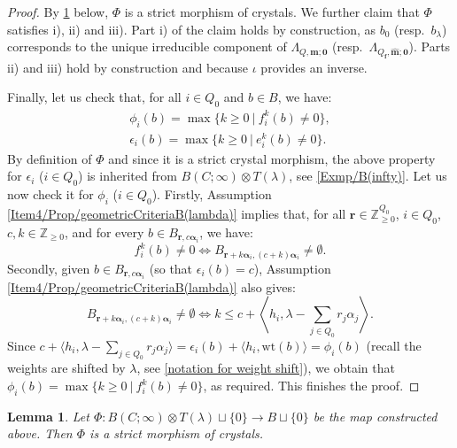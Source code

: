 \documentclass[a4paper,12pt]{article}
\theoremstyle{definition}
\theoremstyle{plain}
\newtheorem{lemma}[definition]{Lemma}
\theoremstyle{remark}
\newcommand\bbZ{\mathbb{Z}}
\newcommand\bfalpha{\bm{\alpha}}
\newcommand\bff{\mathbf{f}}
\newcommand\bfm{\mathbf{m}}
\newcommand\bfr{\mathbf{r}}
\begin{document}
\begin{proof}
By \cref{Lem/forgetfulCrystalMap} below, $\Phi$ is a strict morphism of crystals. We further claim that $\Phi$ satisfies i), ii) and iii). Part i) of the claim holds by construction, as $b_0$ (resp.\ $b_\lambda$) corresponds to the unique irreducible component of $\Lambda_{Q,\bfm;\mathbf{0}}$ (resp.\ $\Lambda_{Q_\bff,\widehat{\bfm};\mathbf{0}}$). Parts ii) and iii) hold by construction and because $\iota$ provides an inverse.

Finally, let us check that, for all $i\in Q_0$ and $b\in B$, we have:
\begin{align*}
\phi_i(b)=\max\{ k\geq0\ \vert\ f_i^k(b)\ne0\} , \\
\epsilon_i(b)=\max\{ k\geq0\ \vert\ e_i^k(b)\ne0\} .
\end{align*}
By definition of $\Phi$ and since it is a strict crystal morphism, the above property for $\epsilon_i$ ($i\in Q_0$) is inherited from $B(C;\infty)\otimes T(\lambda)$, see \cref{Exmp/B(infty)}. Let us now check it for $\phi_i$ ($i\in Q_0$). Firstly, Assumption  \ref{Item4/Prop/geometricCriteriaB(lambda)}  implies that, for all $\bfr\in\bbZ_{\geq0}^{Q_0}$, $i\in Q_0$, $c,k\in\bbZ_{\geq0}$, and for every $b\in B_{\bfr,c\bfalpha_i}$, we have:
\[
f_i^k(b)\ne0
\Leftrightarrow
B_{\bfr+k\bfalpha_i,(c+k)\bfalpha_i}\ne\emptyset
.
\]
Secondly, given $b\in B_{\bfr,c\bfalpha_i}$ (so that $\epsilon_i(b)=c$), Assumption  \ref{Item4/Prop/geometricCriteriaB(lambda)} also gives:
\[
B_{\bfr+k\bfalpha_i,(c+k)\bfalpha_i}\ne\emptyset
\Leftrightarrow
k\leq c+\left\langle h_i,\lambda-\sum_{j\in Q_0}r_j\alpha_j\right\rangle.
\]
Since $c+\langle h_i,\lambda-\sum_{j\in Q_0}r_j\alpha_j\rangle=\epsilon_i(b)+\langle h_i,\mathrm{wt}(b)\rangle =\phi_i(b)$ (recall the weights are shifted by $\lambda$, see \cref{notation for weight shift}), we obtain that $\phi_i(b)=\max\{ k\geq0\ \vert\ f_i^k(b)\ne0\}$, as required. This finishes the proof.
\end{proof}

\begin{lemma}\label{Lem/forgetfulCrystalMap}
Let $\Phi: B(C;\infty)\otimes T(\lambda)\sqcup\{0\}\rightarrow B\sqcup\{0\}$ be the map constructed above. Then $\Phi$ is a strict morphism of crystals.
\end{lemma}
\end{document}
